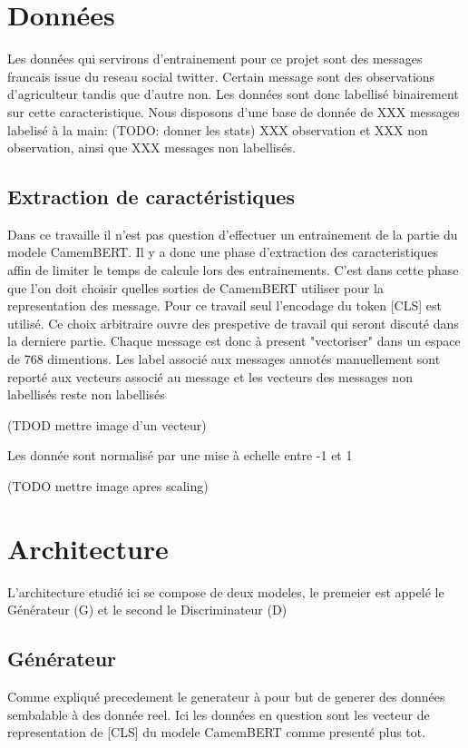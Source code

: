 \documentclass[francais,a4paper]{llncs} %
\begin{document}
\section{Données}
Les données qui servirons d'entrainement pour ce projet sont des messages francais issue du reseau social twitter. Certain message sont des observations d'agriculteur tandis que d'autre non. Les données sont donc labellisé binairement sur cette caracteristique. Nous disposons d'une base de donnée de XXX messages labelisé à la main: (TODO: donner les stats) XXX observation et XXX non observation, ainsi que XXX messages non labellisés.
\subsection{Extraction de caractéristiques}
Dans ce travaille il n'est pas question d'effectuer un entrainement de la partie du modele CamemBERT. Il y a donc une phase d'extraction des caracteristiques affin de limiter le temps de calcule lors des entrainements.
C'est dans cette phase que l'on doit choisir quelles sorties de CamemBERT utiliser pour la representation des message.
Pour ce travail seul l'encodage du token [CLS] est utilisé. Ce choix arbitraire ouvre des prespetive de travail qui seront discuté dans la derniere partie. 
Chaque message est donc à present "vectoriser" dans un espace de 768 dimentions. Les label associé aux messages annotés manuellement sont reporté aux vecteurs associé au message et les vecteurs des messages non labellisés reste non labellisés 

(TDOD mettre image d'un vecteur)

Les donnée sont normalisé par une mise à echelle entre -1 et 1

(TODO mettre image apres scaling)

\section{Architecture}
	
	L'architecture etudié ici se compose de deux modeles, le premeier est appelé le Générateur (G) et le second le Discriminateur (D)

	\subsection{Générateur}
	Comme expliqué precedement le generateur à pour but de generer des données sembalable à des donnée reel. Ici les données en question sont les vecteur de representation de [CLS] du modele CamemBERT comme presenté plus tot.
	
\end{document}

